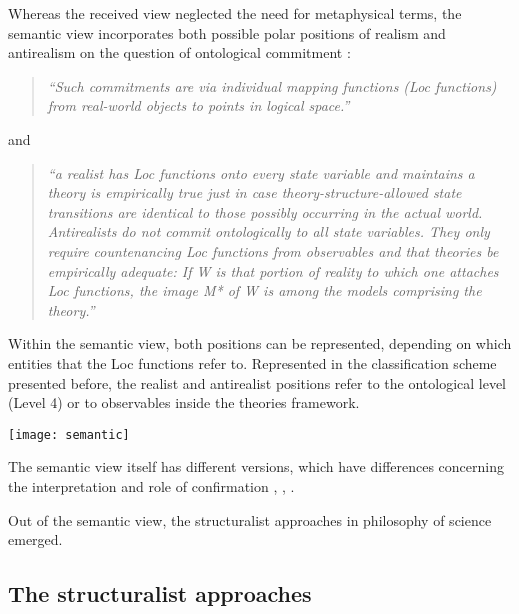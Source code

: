 \documentclass{article}
\begin{document}
Whereas the received view neglected the need for metaphysical terms, the semantic view incorporates both possible polar positions of realism and antirealism on the question of ontological commitment \cite[p.106]{suppe2000understanding}: 

\begin{quote}
\textit{``Such commitments are via individual mapping functions (Loc functions) from real-world objects to points in logical space.''}
\end{quote}

and

\begin{quote}
\textit{``a realist has Loc functions onto every state variable and maintains a theory is empirically true just in case theory-structure-allowed state transitions are identical to those possibly occurring in the actual world. Antirealists do not commit ontologically to all state variables. They only require countenancing Loc functions from observables and that theories be empirically adequate: If W is that portion of reality to which one attaches Loc functions, the image M* of W is among the models comprising the theory.''}
\end{quote}

Within the semantic view, both positions can be represented, depending on which entities that the Loc functions refer to. Represented in the classification scheme presented before, the realist and antirealist positions refer to the ontological level (Level 4) or to observables inside the theories framework. 

\begin{minipage}{\textwidth}
\centering
\texttt{[image: semantic]}

\end{minipage}
\bigskip

The semantic view itself has different versions, which have differences concerning the interpretation and role of confirmation \cite[]{daCosta1990model}, \cite[]{suppe2000understanding}, \cite[]{van1980scientific}.

Out of the semantic view, the structuralist approaches in philosophy of science emerged. 

\newpage

\subsection{The structuralist approaches}
\end{document}
